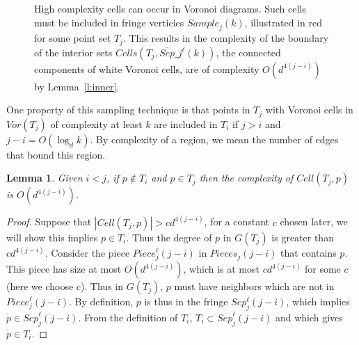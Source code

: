 \documentclass[10pt,a4paper]{amsart}
\newcommand{\Cell}{\mathit{Cell}}
\newcommand{\Cells}{\mathit{Cells}}
\newcommand{\Sample}{\mathit{Sample}}
\newcommand{\Piece}{\mathit{Piece}}
\newcommand{\Pieces}{\mathit{Pieces}}
\newcommand{\Sep}{\mathit{Sep}}
\newcommand{\Voron}{\mathit{Vor}}
\newcommand{\john}[1]{\textcolor{red}{#1}}
\newcommand{\yakov}[1]{\textcolor{blue}{Yakov: #1}}
\newtheorem{lemma}{Lemma}
\begin{document}
\begin{figure}[t]
    \centering
    \caption{
    High complexity cells can occur in Voronoi diagrams. Such cells must be included in fringe verticies $\Sample_j(k)$, illustrated in red for some point set $T_j$. This results in the complexity of the boundary of the interior sets $\Cells(T_j,\overline{\Sep}\_j^\ell(k))$, the connected components of white Voronoi cells, are of complexity $O(d^{4(j-i)})$ by Lemma~\ref{l:inner}.}
    \label{fig:inner}
\end{figure}


One property of this sampling technique is that points in $T_j$ with Voronoi cells in $\Voron(T_j)$ of complexity at least $k$ are included in $T_i$ if $j>i$ and $j-i=O(\log_d k)$. By complexity of a region, we mean the number of edges that bound this region.



\begin{lemma}
Given $i<j$, if $p \not \in T_i$ and $p \in T_j$ then the complexity of $\Cell(T_j,p)$ is $O(d^{4(j-i)})$. 
\end{lemma}

\begin{proof}
 Suppose that $|\Cell(T_j,p)| > c d^{4(j-i)}$, for a constant $c$ chosen later, we will show this implies $p\in T_i$. Thus the degree of $p$ in $G(T_j)$ is greater than $c d^{4(j-i)}$. Consider the piece $\Piece^\ell_j(j-i)$ in $\Pieces_j(j-i)$ that contains $p$. This piece has size at most $O(d^{4(j-i)})$, which is at most $c d^{4(j-i)}$ for some $c$ (here we choose $c$).
 Thus in $G(T_j)$, $p$ must have neighbors which are not in $\Piece^\ell_j(j-i)$. By definition, $p$ is thus in the fringe $Sep^\ell_j(j-i)$, which implies $p \in \Sep^\ell_j(j-i)$. From the definition of $T_i$, $T_i \subset \Sep^\ell_j(j-i)$ and which gives $p \in T_i$. 
 \end{proof}
\end{document}
